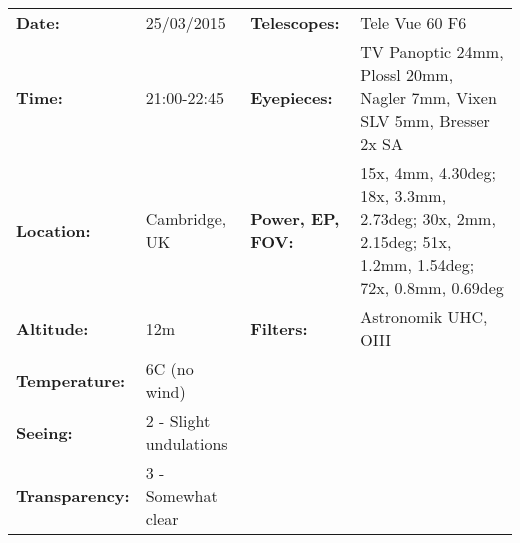 \begin{tabular}{ p{0.9in} p{1.3in} p{1.2in} p{5.2in}}
{\bf Date:} & 25/03/2015 & {\bf Telescopes:} & Tele Vue 60 F6 \\ 
{\bf Time:} & 21:00-22:45 & {\bf Eyepieces:} & TV Panoptic 24mm, Plossl 20mm, Nagler 7mm, Vixen SLV 5mm, Bresser 2x SA \\ 
{\bf Location:} & Cambridge, UK & {\bf Power, EP, FOV:} & 15x, 4mm, 4.30deg; 18x, 3.3mm, 2.73deg; 30x, 2mm, 2.15deg; 51x, 1.2mm, 1.54deg; 72x, 0.8mm, 0.69deg \\ 
{\bf Altitude:} & 12m & {\bf Filters:} & Astronomik UHC, OIII \\ 
{\bf Temperature:} & 6C (no wind) & & \\ 
{\bf Seeing:} & 2 - Slight undulations & & \\ 
{\bf Transparency:} & 3 - Somewhat clear & & \\ 
\end{tabular}
\centering 
